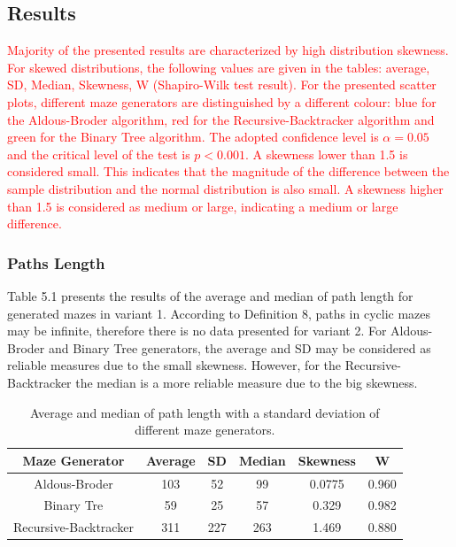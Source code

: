 \subsection{Results}
\textcolor{red}{Majority of the presented results are characterized by high distribution skewness. For skewed distributions, the following values ​​are given in the tables:
average, SD, Median, Skewness, W (Shapiro-Wilk test result). For the presented scatter plots, different maze generators are distinguished by a different colour:
blue for the Aldous-Broder algorithm, red for the Recursive-Backtracker algorithm and green for the Binary Tree algorithm. The adopted confidence level is $\alpha = 0.05$ and 
the critical level of the test is $p<0.001$. A skewness lower than 1.5 is considered small. This indicates that the magnitude of the difference between the
sample distribution and the normal distribution is also small. A skewness higher than 1.5 is considered as medium or large, indicating a medium or large difference.}
\subsubsection{Paths Length}
Table 5.1 presents the results of the average and median of path length for generated mazes in variant 1.
According to Definition 8, paths in cyclic mazes may be infinite, therefore there is no data presented for variant 2. For Aldous-Broder and Binary Tree
generators, the average and SD may be considered as reliable measures due to the small skewness. However, for the Recursive-Backtracker the median is a more 
reliable measure due to the big skewness.
   
    \begin{table}[!ht]
        \centering
        \caption{Average and median of path length with a standard deviation of different maze generators.}
        \begin{tabular}{c c c c c c}
        \hline
            Maze Generator & Average & SD & Median & Skewness & W\\ \hline
            Aldous-Broder & 103 & 52 & 99 & 0.0775 & 0.960\\ 
            Binary Tre & 59 & 25 & 57 & 0.329 & 0.982\\ 
            Recursive-Backtracker & 311 & 227 & 263 & 1.469 & 0.880\\ \hline
        \end{tabular}
    \end{table}

